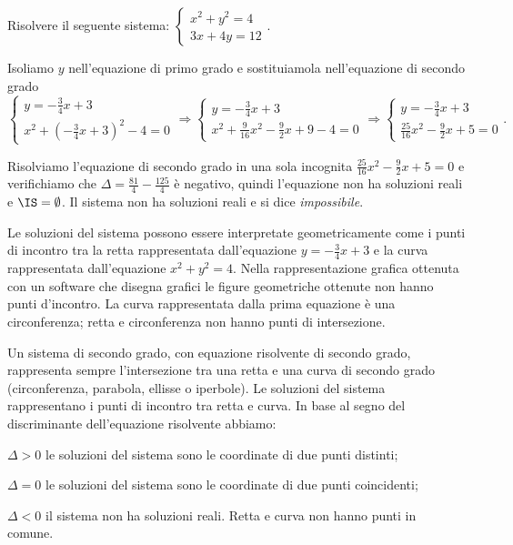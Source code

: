 \begin{esempio}
Risolvere il seguente sistema: $\left\{\begin{array}{l}x^2+y^2=4 
\\3x+4y=12\end{array}\right..$

Isoliamo $y$ nell'equazione di primo grado e sostituiamola nell'equazione di 
secondo grado 
\[\left\{\begin{array}{l}y=-\frac 3 4x+3 \\
x^2+\left(-\frac 3 4x+3\right)^2-4=0\end{array}\right. 
\Rightarrow\left\{\begin{array}{l}y=-\frac 3 4x+3 \\
x^2+\frac 9{16}x^2-\frac 9 2x+9-4=0\end{array}\right. 
\Rightarrow\left\{\begin{array}{l}y=-\frac 3 4x+3 \\
\frac{25}{16}x^2-\frac{9}{2}x+5=0\end{array}\right..\]

Risolviamo l'equazione di secondo grado in una sola incognita 
$\frac{25}{16}x^2-\frac 9 2x+5=0$ e verifichiamo che $\Delta =\frac{81} 
4-\frac{125} 4$ è negativo, quindi l'equazione non ha soluzioni reali e 
$\IS=\emptyset $. Il sistema non ha soluzioni reali e si dice 
\emph{impossibile}.

\begin{multicols}{2}
Le soluzioni del sistema possono essere interpretate geometricamente come i 
punti di incontro tra la retta rappresentata dall'equazione $y=-\frac 3 4x+3$ e 
la curva rappresentata dall'equazione $x^2+y^2=4$. Nella rappresentazione 
grafica ottenuta con un software che disegna grafici le figure geometriche 
ottenute non hanno punti d'incontro.
La curva rappresentata dalla prima equazione è una circonferenza; retta e 
circonferenza non hanno punti di intersezione.
\begin{center}

\end{center}
 \end{multicols}
\end{esempio}

\conclusione
Un sistema di secondo grado, con equazione risolvente di secondo grado, 
rappresenta sempre l'intersezione tra una retta e una curva di secondo grado 
(circonferenza, parabola, ellisse o iperbole). Le soluzioni del sistema 
rappresentano i punti di incontro tra retta e curva. In base al segno del 
discriminante dell'equazione risolvente abbiamo:
\begin{itemize*}
\item $\Delta >0$ le soluzioni del sistema sono le coordinate di due punti 
distinti;
\item $\Delta =0$ le soluzioni del sistema sono le coordinate di due punti 
coincidenti;
\item $\Delta <0$ il sistema non ha soluzioni reali. Retta e curva non hanno 
punti in comune.
\end{itemize*}
\begin{center}

\end{center}

